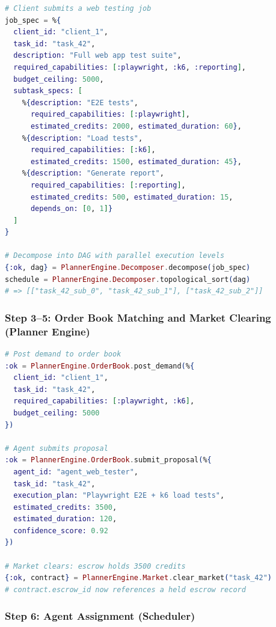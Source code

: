 \documentclass[12pt,a4paper]{article}
\theoremstyle{definition}
\begin{document}
\begin{lstlisting}[language=elixir, caption={Job submission and decomposition}]
# Client submits a web testing job
job_spec = %{
  client_id: "client_1",
  task_id: "task_42",
  description: "Full web app test suite",
  required_capabilities: [:playwright, :k6, :reporting],
  budget_ceiling: 5000,
  subtask_specs: [
    %{description: "E2E tests",
      required_capabilities: [:playwright],
      estimated_credits: 2000, estimated_duration: 60},
    %{description: "Load tests",
      required_capabilities: [:k6],
      estimated_credits: 1500, estimated_duration: 45},
    %{description: "Generate report",
      required_capabilities: [:reporting],
      estimated_credits: 500, estimated_duration: 15,
      depends_on: [0, 1]}
  ]
}

# Decompose into DAG with parallel execution levels
{:ok, dag} = PlannerEngine.Decomposer.decompose(job_spec)
schedule = PlannerEngine.Decomposer.topological_sort(dag)
# => [["task_42_sub_0", "task_42_sub_1"], ["task_42_sub_2"]]
\end{lstlisting}

\subsubsection{Step 3--5: Order Book Matching and Market Clearing (Planner Engine)}

\begin{lstlisting}[language=elixir, caption={Market clearing with escrow}]
# Post demand to order book
:ok = PlannerEngine.OrderBook.post_demand(%{
  client_id: "client_1",
  task_id: "task_42",
  required_capabilities: [:playwright, :k6],
  budget_ceiling: 5000
})

# Agent submits proposal
:ok = PlannerEngine.OrderBook.submit_proposal(%{
  agent_id: "agent_web_tester",
  task_id: "task_42",
  execution_plan: "Playwright E2E + k6 load tests",
  estimated_credits: 3500,
  estimated_duration: 120,
  confidence_score: 0.92
})

# Market clears: escrow holds 3500 credits
{:ok, contract} = PlannerEngine.Market.clear_market("task_42")
# contract.escrow_id now references a held escrow record
\end{lstlisting}

\subsubsection{Step 6: Agent Assignment (Scheduler)}
\end{document}
